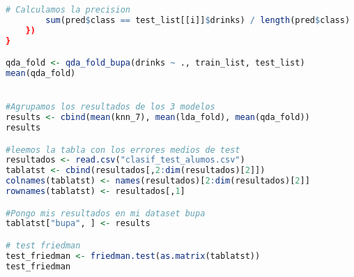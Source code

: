 \begin{lstlisting}[language=R]
		# Calculamos la precision
		sum(pred$class == test_list[[i]]$drinks) / length(pred$class)
	})
}

qda_fold <- qda_fold_bupa(drinks ~ ., train_list, test_list)
mean(qda_fold)


#Agrupamos los resultados de los 3 modelos
results <- cbind(mean(knn_7), mean(lda_fold), mean(qda_fold))
results

#leemos la tabla con los errores medios de test
resultados <- read.csv("clasif_test_alumos.csv")
tablatst <- cbind(resultados[,2:dim(resultados)[2]])
colnames(tablatst) <- names(resultados)[2:dim(resultados)[2]]
rownames(tablatst) <- resultados[,1]

#Pongo mis resultados en mi dataset bupa
tablatst["bupa", ] <- results

# test friedman
test_friedman <- friedman.test(as.matrix(tablatst))
test_friedman
\end{lstlisting}